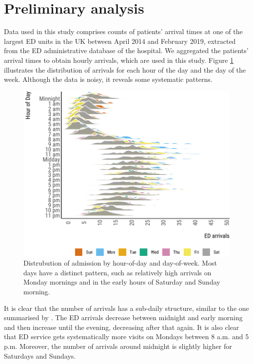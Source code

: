 \documentclass[]{elsarticle} %
\begin{document}
\hypertarget{data}{%
\section{Preliminary analysis}\label{data}}

Data used in this study comprises counts of patients' arrival times at one of the largest ED units in the UK between April 2014 and February 2019, extracted from the ED administrative database of the hospital. We aggregated the patients' arrival times to obtain hourly arrivals, which are used in this study. Figure \ref{fig:hourly-plot-ridge} illustrates the distribution of arrivals for each hour of the day and the day of the week. Although the data is noisy, it reveals some systematic patterns.

\begin{figure}[H]

{\centering \includegraphics{paper_files/figure-latex/hourly-plot-ridge-1} 

}

\caption{Distrubution of admission by hour-of-day and day-of-week. Most days have a distinct pattern, such as relatively high arrivals on Monday mornings and in the early hours of Saturday and Sunday morning.}\label{fig:hourly-plot-ridge}
\end{figure}

It is clear that the number of arrivals has a sub-daily structure, similar to the one summarised by \citet{hertzum2017forecasting}. The ED arrivals decrease between midnight and early morning and then increase until the evening, decreasing after that again. It is also clear that ED service gets systematically more visits on Mondays between 8 a.m. and 5 p.m. Moreover, the number of arrivals around midnight is slightly higher for Saturdays and Sundays.
\end{document}
